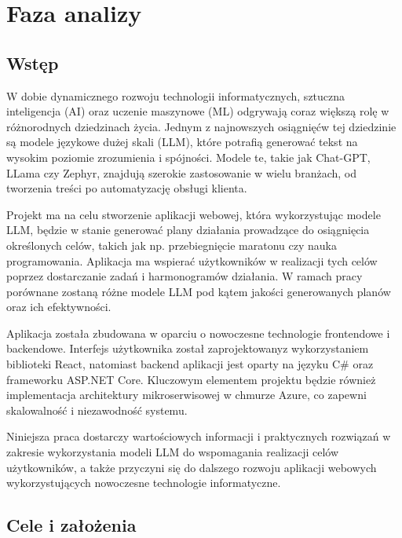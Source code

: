 \section{Faza analizy}
\subsection{Wstęp}

W dobie dynamicznego rozwoju technologii informatycznych, sztuczna inteligencja (AI) oraz uczenie maszynowe (ML) odgrywają coraz większą rolę w różnorodnych dziedzinach życia. Jednym z najnowszych osiągnięć\linebreak w tej dziedzinie są modele językowe dużej skali (LLM), które potrafią generować tekst na wysokim poziomie zrozumienia i spójności. Modele te, takie jak Chat-GPT, LLama czy Zephyr, znajdują szerokie zastosowanie w wielu branżach, od tworzenia treści po automatyzację obsługi klienta.

Projekt ma na celu stworzenie aplikacji webowej, która wykorzystując modele LLM, będzie w stanie generować plany działania prowadzące do osiągnięcia określonych celów, takich jak np. przebiegnięcie maratonu czy nauka programowania. Aplikacja ma wspierać użytkowników w realizacji tych celów poprzez dostarczanie zadań i harmonogramów działania. W ramach pracy porównane zostaną różne modele LLM pod kątem jakości generowanych planów oraz ich efektywności.

Aplikacja została zbudowana w oparciu o nowoczesne technologie frontendowe i backendowe. Interfejs użytkownika został zaprojektowany\linebreak z wykorzystaniem biblioteki React, natomiast backend aplikacji jest oparty na języku C\# oraz frameworku ASP.NET Core. Kluczowym elementem projektu będzie również implementacja architektury mikroserwisowej w chmurze Azure, co zapewni skalowalność i niezawodność systemu.

Niniejsza praca dostarczy wartościowych informacji i praktycznych rozwiązań w zakresie wykorzystania modeli LLM do wspomagania realizacji celów użytkowników, a także przyczyni się do dalszego rozwoju aplikacji webowych wykorzystujących nowoczesne technologie informatyczne.

\clearpage

\subsection{Cele i założenia}


